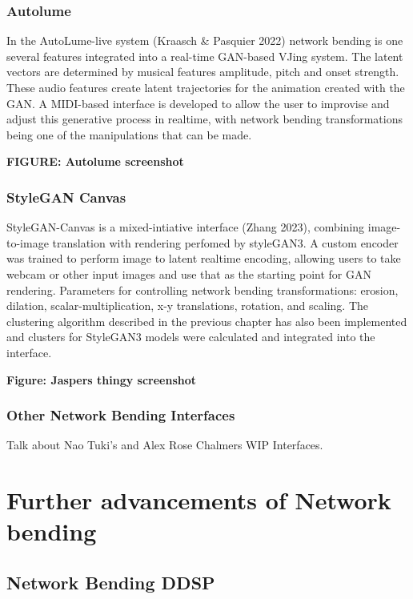 \subsubsection{Autolume}

In the AutoLume-live system (Kraasch \& Pasquier 2022) network bending is one several features integrated into a real-time GAN-based VJing system. 
The latent vectors are determined by musical features amplitude, pitch and onset strength. 
These audio features create latent trajectories for the animation created with the GAN. 
A MIDI-based interface is developed to allow the user to improvise and adjust this generative process in realtime, with network bending transformations being one of the manipulations that can be made. 

\textbf{FIGURE: Autolume screenshot}

\subsubsection{StyleGAN Canvas}

StyleGAN-Canvas is a mixed-intiative interface (Zhang 2023), combining image-to-image translation with rendering perfomed by styleGAN3. 
A custom encoder was trained to perform image to latent realtime encoding, allowing users to take webcam or other input images and use that as the starting point for GAN rendering. 
Parameters for controlling network bending transformations:  erosion, dilation, scalar-multiplication, x-y translations, rotation, and scaling. 
The clustering algorithm described in the previous chapter has also been implemented and clusters for StyleGAN3 models were calculated and integrated into the interface.

\textbf{Figure: Jaspers thingy screenshot}

\subsubsection{Other Network Bending Interfaces}

Talk about Nao Tuki's and Alex Rose Chalmers WIP Interfaces.

\section{Further advancements of Network bending}

\subsection{Network Bending DDSP}

